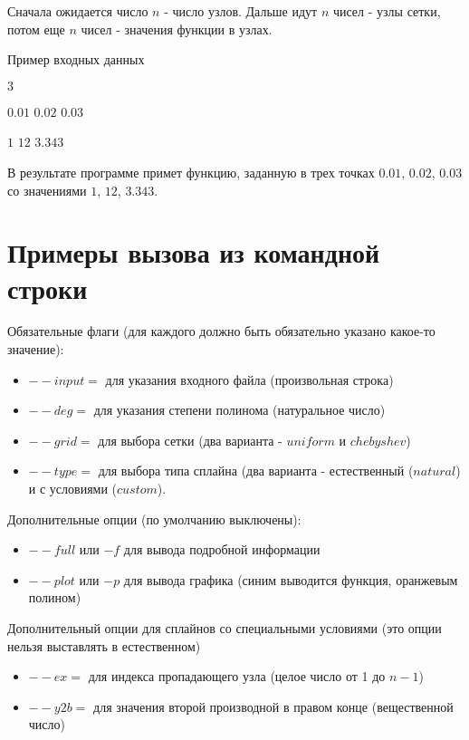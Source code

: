 \documentclass[paper=a4, fontsize=11pt]{scrartcl} %
\numberwithin{equation}{section} %
\numberwithin{figure}{section} %
\numberwithin{table}{section} %
\begin{document}
Сначала ожидается число $n$ - число узлов.
Дальше идут $n$ чисел - узлы сетки, потом еще $n$ чисел - значения функции в узлах.

Пример входных данных

$3$

$0.01$ $0.02$ $0.03$

$1$ $12$ $3.343$


В результате программе примет функцию, заданную в трех точках $0.01$, $0.02$, $0.03$ со значениями $1$, $12$, $3.343$.

\section{Примеры вызова из командной строки}

Обязательные флаги (для каждого должно быть обязательно указано какое-то значение):

\begin{itemize}
	\item $--input=$ для указания входного файла (произвольная строка)
    \item $--deg=$ для указания степени полинома (натуральное число)
    \item $--grid=$ для выбора сетки (два варианта - $uniform$ и $chebyshev$)
    \item $--type=$ для выбора типа сплайна (два варианта - естественный ($natural$) и с условиями ($custom$).
\end{itemize}

Дополнительные опции (по умолчанию выключены):

\begin{itemize}
	\item $--full$ или $-f$ для вывода подробной информации 
    \item $--plot$ или $-p$ для вывода графика (синим выводится функция, оранжевым полином)
\end{itemize}

Дополнительный опции для сплайнов со специальными условиями (это опции нельзя выставлять в естественном)

\begin{itemize}
	\item $--ex=$ для индекса пропадающего узла (целое число от 1 до $n - 1$)
    \item $--y2b=$ для значения второй производной в правом конце (вещественной число)
\end{itemize}
\end{document}
